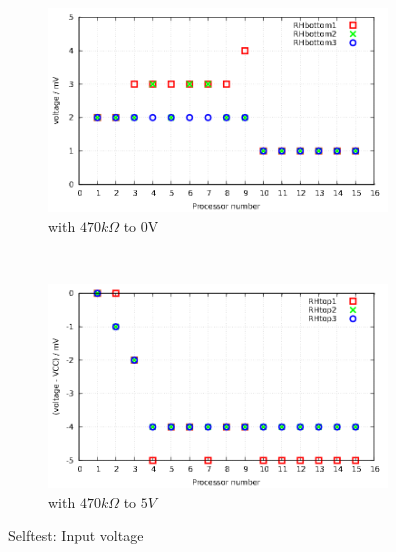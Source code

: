 \begin{figure}[H]
  \begin{subfigure}[b]{9cm}
  \centering
    \includegraphics[width=9cm]{../GNU/SelfTbottomH.pdf}
    \caption{with \(470k\Omega\) to 0V}
    \label{fig:SelfTlowH}
  \end{subfigure}
  ~
  \begin{subfigure}[b]{9cm}
  \centering
    \includegraphics[width=9cm]{../GNU/SelfTtopH.pdf}
    \caption{with \(470k\Omega\) to \(5V\)}
    \label{fig:SelfTtopH}
  \end{subfigure}
  \caption{Selftest: Input voltage}
\end{figure}

